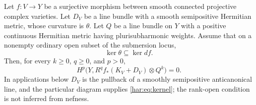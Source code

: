 \begin{theorem}\label{har:thm:kernel}
Let $f:V\to Y$ be a surjective morphism between smooth connected projective complex varieties. Let $D_V$ be a line bundle with a smooth semipositive Hermitian metric, whose curvature is $\theta$. Let $Q$ be a line bundle on $Y$ with a positive continuous Hermitian metric having plurisubharmonic weights.
Assume that on a nonempty ordinary open subset of the submersion locus,
\begin{equation}\label{har:eq:kernel}
 \ker\theta\subseteq\ker df.
\end{equation}
Then, for every \(k\ge0\), \(q\ge0\), and \(p>0\),
\begin{equation}\label{har:eq:vanishing}
 H^p\bigl(Y,R^q f_*(K_V+D_V)\otimes Q^k\bigr)=0.
\end{equation}
In applications below \(D_V\) is the pullback of a smoothly semipositive
anticanonical line, and the particular diagram supplies
\eqref{har:eq:kernel}; the rank-open condition is not inferred from nefness.
\end{theorem}

